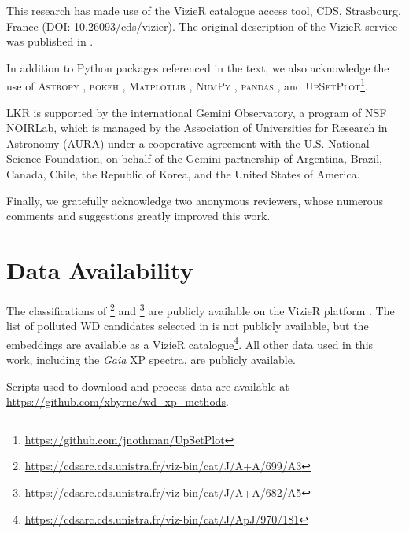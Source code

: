 \documentclass[fleqn,usenatbib]{rasti}
\begin{document}
This research has made use of the VizieR catalogue access tool, CDS, Strasbourg, France (DOI: 10.26093/cds/vizier).
The original description of the VizieR service was published in \citet{ochsenbein00}.

In addition to Python packages referenced in the text, we also acknowledge the use of \textsc{Astropy} \citep{astropy1, astropy2, astropy3}, \textsc{bokeh} \citep{bokeh}, \textsc{Matplotlib} \citep{matplotlib}, \textsc{NumPy} \citep{numpy}, \textsc{pandas} \citep{pandas1, pandas2}, and \textsc{UpSetPlot}\footnote{\url{https://github.com/jnothman/UpSetPlot}}.

LKR is supported by the international Gemini Observatory, a program of NSF NOIRLab, which is managed by the Association of Universities for Research in Astronomy (AURA) under a cooperative agreement with the U.S. National Science Foundation, on behalf of the Gemini partnership of Argentina, Brazil, Canada, Chile, the Republic of Korea, and the United States of America.

Finally, we gratefully acknowledge two anonymous reviewers, whose numerous comments and suggestions greatly improved this work.

\section*{Data Availability}

The classifications of \citet{garciazamora25}\footnote{
    \url{https://cdsarc.cds.unistra.fr/viz-bin/cat/J/A+A/699/A3}
} and \citet{vincent24}\footnote{
    \url{https://cdsarc.cds.unistra.fr/viz-bin/cat/J/A+A/682/A5}
} are publicly available on the VizieR platform \citep{ochsenbein00}.
The list of polluted WD candidates selected in \citet{kao24} is not publicly available, but the embeddings are available as a VizieR catalogue\footnote{
    \url{https://cdsarc.cds.unistra.fr/viz-bin/cat/J/ApJ/970/181}
}.
All other data used in this work, including the \textit{Gaia} XP spectra, are publicly available.

Scripts used to download and process data are available at
\url{https://github.com/xbyrne/wd_xp_methods}.



\end{document}
